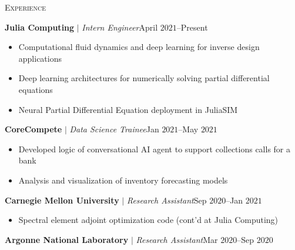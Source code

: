 \documentclass[10pt]{article}
\begin{document}
\begin{multicols}{2}
\textsc{Experience}
\columnbreak

\textbf{Julia Computing} $|$ \textit{Intern Engineer}\hfill April $2021$--Present

\vspace{-1.75em}
\begin{itemize}[label=-,leftmargin=1.0em]
    \setlength\itemsep{-0.25em}
    \item Computational fluid dynamics and deep learning for inverse design applications
    \item Deep learning architectures for numerically solving partial differential equations
    \item Neural Partial Differential Equation deployment in JuliaSIM
\end{itemize}
\vspace{-2.0em}

\vspace{0.5em}
%
\textbf{CoreCompete} $|$ \textit{Data Science Trainee}\hfill Jan $2021$--May $2021$

\vspace{-1.75em}
\begin{itemize}[label=-,leftmargin=1.0em]
    \setlength\itemsep{-0.25em}
    \item Developed logic of conversational AI agent to support collections calls for a bank
    \item Analysis and visualization of inventory forecasting models
\end{itemize}
\vspace{-2.0em}

\vspace{0.5em}
%
\textbf{Carnegie Mellon University} $|$ \textit{Research Assistant}\hfill Sep $2020$--Jan $2021$

\vspace{-1.75em}
\begin{itemize}[label=-,leftmargin=1.0em]
    \setlength\itemsep{-0.25em}
    \item Spectral element adjoint optimization code %
    (cont'd at Julia Computing)
\end{itemize}
\vspace{-2.0em}

\vspace{0.5em}
%
\textbf{Argonne National Laboratory} $|$ \textit{Research Assistant}\hfill Mar $2020$--Sep $2020$


\end{multicols}
\end{document}
